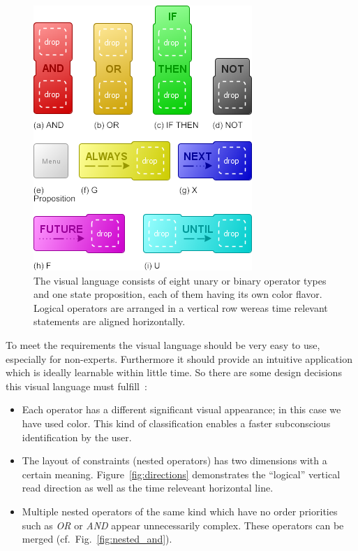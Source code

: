\documentclass[conference]{IEEEtran}
\begin{document}
\begin{figure}[htbp]
  \centering
  \includegraphics[scale=0.5]{table}
  \caption{The visual language consists of eight unary or binary operator types and one state proposition, each of them having its own color flavor. Logical operators are arranged in a vertical row wereas time relevant statements are aligned horizontally.}
  \label{fig:operators}
\end{figure}



To meet the requirements the visual language should be very easy to use, especially for non-experts. Furthermore it should provide an intuitive application which is ideally learnable within little time. So there are some design decisions this visual language must fulfill~\cite{moody-physics-of-notations}:

\begin{itemize}
	\item Each operator has a different significant visual appearance; in this case we have used color. This kind of classification enables a faster subconscious identification by the user.
	\item The layout of constraints (nested operators) has two dimensions with a certain meaning. Figure~\ref{fig:directions} demonstrates the ``logical'' vertical read direction as well as the time releveant horizontal line.
	\item Multiple nested operators of the same kind which have no order priorities such as \emph{OR} or \emph{AND} appear unnecessarily complex. These operators can be merged (cf.~Fig.~\ref{fig:nested_and}).
\end{itemize}
\end{document}
